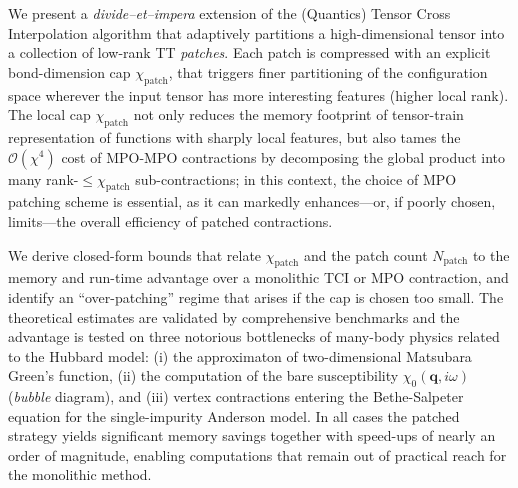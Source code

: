 
We present a \emph{divide–et–impera} extension of the (Quantics) Tensor Cross Interpolation algorithm \cite{Fernandez2024} that adaptively partitions a high-dimensional tensor into a collection of low-rank TT \emph{patches}. Each patch is compressed with an explicit bond-dimension cap \(\chi_{\text{patch}}\), that triggers finer partitioning of the configuration space wherever the input tensor has more interesting features (higher local rank). The local cap \(\chi_{\text{patch}}\) not only reduces the memory footprint of tensor-train representation of functions with sharply local features, but also tames the \(\mathcal{O}(\chi^{4})\) cost of MPO-MPO contractions by decomposing the global product into many rank-\(\le\chi_{\text{patch}}\) sub-contractions; in this context, the choice of MPO patching scheme is essential, as it can markedly enhances—or, if poorly chosen, limits—the overall efficiency of patched contractions.

We derive closed-form bounds that relate \(\chi_{\text{patch}}\) and the patch count \(N_{\text{patch}}\) to the memory and run-time advantage over a monolithic TCI or MPO contraction, and identify an ``over-patching'' regime that arises if the cap is chosen too small.  The theoretical estimates are validated by comprehensive benchmarks and the advantage is tested on three notorious bottlenecks of many-body physics related to the Hubbard model: (i) the approximaton of two-dimensional Matsubara Green's function,  
(ii) the computation of the bare susceptibility \(\chi_{0}(\mathbf q,i\omega)\)  
(\emph{bubble} diagram), and (iii) vertex contractions entering the Bethe-Salpeter equation for the single-impurity Anderson model. In all cases the patched strategy yields significant memory savings together with speed-ups of nearly an order of magnitude, enabling computations that remain out of practical reach for the monolithic method.

